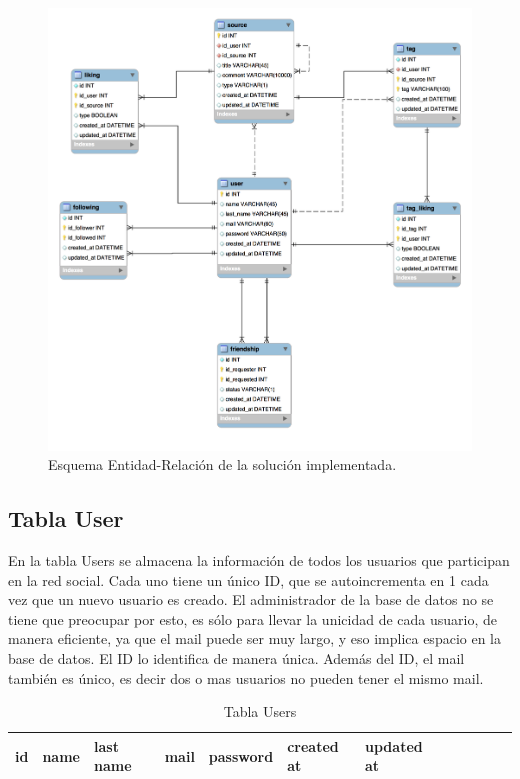 \documentclass[12pt,letterpaper]{article}
\begin{document}
\begin{figure}[hb]
  \centering
  \includegraphics[scale=0.4]{images/modelo.png}
  \caption[Close up of \textit{Hemidactylus} sp.]
   {Esquema Entidad-Relación de la solución implementada.}
\label{fig:esquema}
\end{figure}



\subsection{Tabla User}
En la tabla Users se almacena la información de todos los usuarios que participan en la red social. Cada uno tiene un único ID, que se autoincrementa en 1 cada vez que un nuevo usuario es creado. El administrador de la base de datos no se tiene que preocupar por esto, es sólo para llevar la unicidad de cada usuario, de manera eficiente, ya que el mail puede ser muy largo, y eso implica espacio en la base de datos. El ID lo identifica de manera única. Además del ID, el mail también es único, es decir dos o mas usuarios no pueden tener el mismo mail. 
\begin{table}[!ht]  
\begin{center}	
	\begin{tabular}{||c|l|l|l|l|l|l|l|l|l|l|l||} \hline 
	id & name & last name & mail & password & created at & updated at \\ \hline
	\end{tabular}
	\caption {Tabla Users}
\end{center}  
\end{table}
\end{document}
